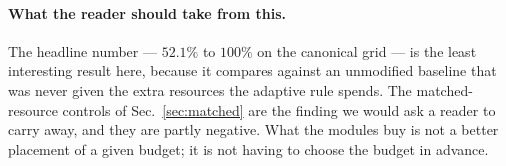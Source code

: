 \paragraph{What the reader should take from this.} The headline number ---
$52.1\%$ to $100\%$ on the canonical grid --- is the least interesting result
here, because it compares against an unmodified baseline that was never given
the extra resources the adaptive rule spends. The matched-resource controls
of Sec.~\ref{sec:matched} are the finding we would ask a reader to carry
away, and they are partly negative. What the modules buy is not a better
placement of a given budget; it is not having to choose the budget in
advance.

